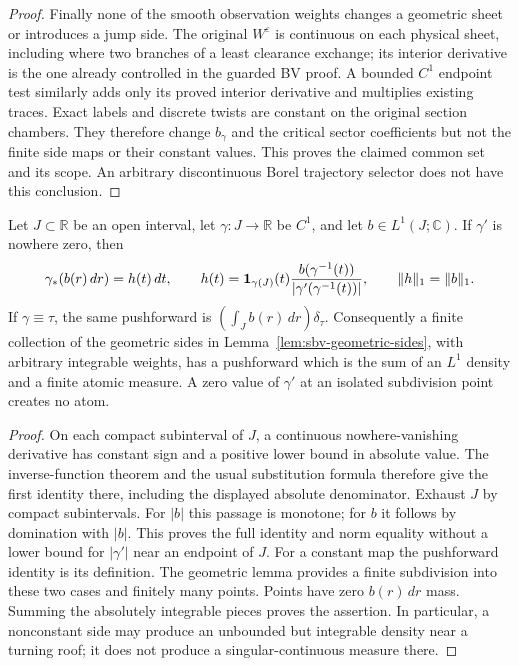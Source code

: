 \begin{proof}
Finally none of the smooth observation weights changes a
geometric sheet or introduces a jump side. The original
$W^\varepsilon$ is continuous on each physical sheet,
including where two branches of a least clearance exchange;
its interior derivative is the one already controlled in
the guarded BV proof. A bounded $C^1$ endpoint test similarly
adds only its proved interior derivative and multiplies
existing traces. Exact labels and discrete twists are constant
on the original section chambers. They therefore change
$b_\gamma$ and the critical sector coefficients but not the
finite side maps or their constant values. This proves the
claimed common set and its scope. An arbitrary discontinuous
Borel trajectory selector does not have this conclusion.
\end{proof}

\begin{lemma}
\label{lem:sbv-arc}
Let $J\subset\mathbb R$ be an open interval, let
$\gamma:J\to\mathbb R$ be $C^1$, and let $b\in L^1(J;\mathbb C)$.
If $\gamma'$ is nowhere zero, then
\[
 \gamma_*(b(r)\,dr)=h(t)\,dt,\qquad
 h(t)=\mathbf1_{\gamma(J)}(t)
       \frac{b(\gamma^{-1}(t))}{|\gamma'(\gamma^{-1}(t))|},
 \qquad \|h\|_1=\|b\|_1.
\]
If $\gamma\equiv\tau$, the same pushforward is
$(\int_J b(r)\,dr)\delta_\tau$.  Consequently a finite collection
of the geometric sides in Lemma~\ref{lem:sbv-geometric-sides},
with arbitrary integrable weights, has a pushforward which is the
sum of an $L^1$ density and a finite atomic measure.  A zero value
of $\gamma'$ at an isolated subdivision point creates no atom.
\end{lemma}
\begin{proof}
On each compact subinterval of $J$, a continuous nowhere-vanishing
derivative has constant sign and a positive lower bound in absolute
value.  The inverse-function theorem and the usual substitution
formula therefore give the first identity there, including the
displayed absolute denominator.  Exhaust $J$ by compact subintervals.
For $|b|$ this passage is monotone; for $b$ it follows by domination
with $|b|$.  This proves the full identity and norm equality without
a lower bound for $|\gamma'|$ near an endpoint of $J$.
For a constant map the pushforward identity is its definition.
The geometric lemma provides a finite subdivision into these two
cases and finitely many points.  Points have zero $b(r)\,dr$ mass.
Summing the absolutely integrable pieces proves the assertion.
In particular, a nonconstant side may produce an unbounded but
integrable density near a turning roof; it does not produce a
singular-continuous measure there.
\end{proof}

